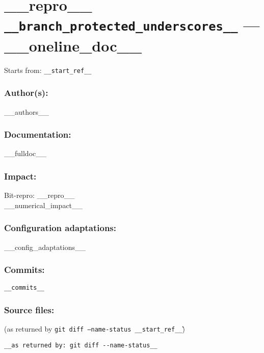 \newpage
\section{__repro__ \texttt{__branch_protected_underscores__} --- __oneline_doc__}
\label{branch:__branch__}
Starts from: \texttt{__start_ref__}

\subsubsection*{Author(s):}
__authors__

\subsubsection*{Documentation:}
__fulldoc__

\subsubsection*{Impact:}
\noindent Bit-repro: __repro__\\
__numerical_impact__

\subsubsection*{Configuration adaptations:}
__config_adaptations__

\subsubsection*{Commits:}
\begin{lstlisting}
__commits__
\end{lstlisting}

\subsubsection*{Source files:}
(as returned by \`\texttt{git diff --name-status __start_ref__}\`)\\
\begin{lstlisting}
__as returned by: git diff --name-status__
\end{lstlisting}
